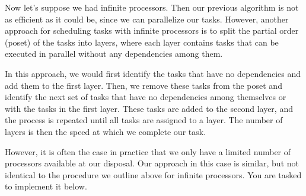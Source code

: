 \documentclass{article}
\begin{document}



    Now let's suppose we had infinite processors. Then our previous algorithm is not as efficient as it could be, since we can parallelize our tasks. However, another approach for scheduling tasks with infinite processors is to split the partial order (poset) of the tasks into layers, where each layer contains tasks that can be executed in parallel without any dependencies among them.

    \vspace{2mm}
    In this approach, we would first identify the tasks that have no dependencies and add them to the first layer. Then, we remove these tasks from the poset and identify the next set of tasks that have no dependencies among themselves or with the tasks in the first layer. These tasks are added to the second layer, and the process is repeated until all tasks are assigned to a layer. The number of layers is then the speed at which we complete our task.

    \vspace{2mm}    
    However, it is often the case in practice that we only have a limited number of processors available at our disposal. Our approach in this case is similar, but not identical to the procedure we outline above for infinite processors. You are tasked to implement it below.
\end{document}
